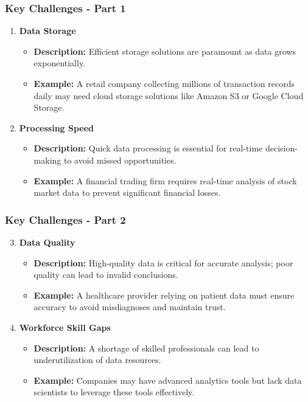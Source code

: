 \documentclass[aspectratio=169]{beamer}
\begin{document}
\begin{frame}[fragile]
    \frametitle{Key Challenges - Part 1}
    \begin{enumerate}
        \item \textbf{Data Storage}
        \begin{itemize}
            \item \textbf{Description:} Efficient storage solutions are paramount as data grows exponentially.
            \item \textbf{Example:} A retail company collecting millions of transaction records daily may need cloud storage solutions like Amazon S3 or Google Cloud Storage.
        \end{itemize}

        \item \textbf{Processing Speed}
        \begin{itemize}
            \item \textbf{Description:} Quick data processing is essential for real-time decision-making to avoid missed opportunities.
            \item \textbf{Example:} A financial trading firm requires real-time analysis of stock market data to prevent significant financial losses.
        \end{itemize}
    \end{enumerate}
\end{frame}

\begin{frame}[fragile]
    \frametitle{Key Challenges - Part 2}
    \begin{enumerate}
        \setcounter{enumi}{2} %
        \item \textbf{Data Quality}
        \begin{itemize}
            \item \textbf{Description:} High-quality data is critical for accurate analysis; poor quality can lead to invalid conclusions.
            \item \textbf{Example:} A healthcare provider relying on patient data must ensure accuracy to avoid misdiagnoses and maintain trust.
        \end{itemize}

        \item \textbf{Workforce Skill Gaps}
        \begin{itemize}
            \item \textbf{Description:} A shortage of skilled professionals can lead to underutilization of data resources.
            \item \textbf{Example:} Companies may have advanced analytics tools but lack data scientists to leverage these tools effectively.
        \end{itemize}
    \end{enumerate}
\end{frame}
\end{document}
